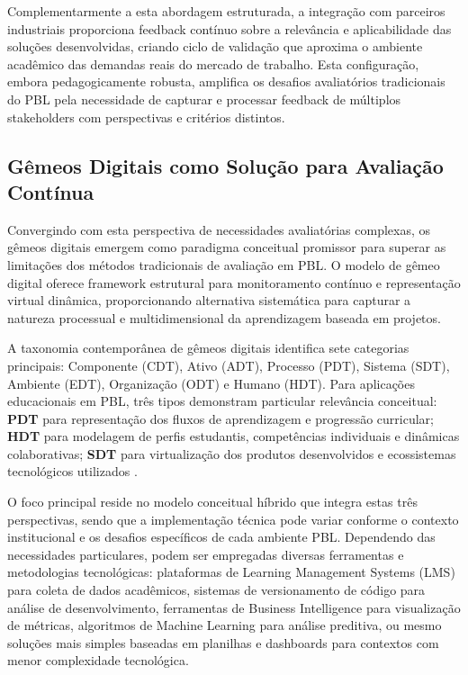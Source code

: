 \documentclass[english, spanish, brazilian]{RBIEarticle} %
\begin{document}
Complementarmente a esta abordagem estruturada, a integração com parceiros
industriais proporciona feedback contínuo sobre a relevância e aplicabilidade
das soluções desenvolvidas, criando ciclo de validação que aproxima o ambiente
acadêmico das demandas reais do mercado de trabalho. Esta configuração, embora
pedagogicamente robusta, amplifica os desafios avaliatórios tradicionais do PBL
pela necessidade de capturar e processar feedback de múltiplos stakeholders com
perspectivas e critérios distintos.

\subsection{Gêmeos Digitais como Solução para Avaliação Contínua}

\indent

Convergindo com esta perspectiva de necessidades avaliatórias complexas, os
gêmeos digitais emergem como paradigma conceitual promissor para superar as
limitações dos métodos tradicionais de avaliação em PBL. O modelo de gêmeo
digital oferece framework estrutural para monitoramento contínuo e
representação virtual dinâmica, proporcionando alternativa sistemática para
capturar a natureza processual e multidimensional da aprendizagem baseada em
projetos.

A taxonomia contemporânea de gêmeos digitais identifica sete categorias
principais: Componente (CDT), Ativo (ADT), Processo (PDT), Sistema (SDT),
Ambiente (EDT), Organização (ODT) e Humano (HDT). Para aplicações educacionais
em PBL, três tipos demonstram particular relevância conceitual: \textbf{PDT}
para representação dos fluxos de aprendizagem e progressão curricular;
\textbf{HDT} para modelagem de perfis estudantis, competências individuais e
dinâmicas colaborativas; \textbf{SDT} para virtualização dos produtos
desenvolvidos e ecossistemas tecnológicos utilizados
\cite{DigitalTwinsEducation2024}.

O foco principal reside no modelo conceitual híbrido que integra estas três
perspectivas, sendo que a implementação técnica pode variar conforme o contexto
institucional e os desafios específicos de cada ambiente PBL. Dependendo das
necessidades particulares, podem ser empregadas diversas ferramentas e
metodologias tecnológicas: plataformas de Learning Management Systems (LMS)
para coleta de dados acadêmicos, sistemas de versionamento de código para
análise de desenvolvimento, ferramentas de Business Intelligence para
visualização de métricas, algoritmos de Machine Learning para análise
preditiva, ou mesmo soluções mais simples baseadas em planilhas e dashboards
para contextos com menor complexidade tecnológica.
\end{document}
